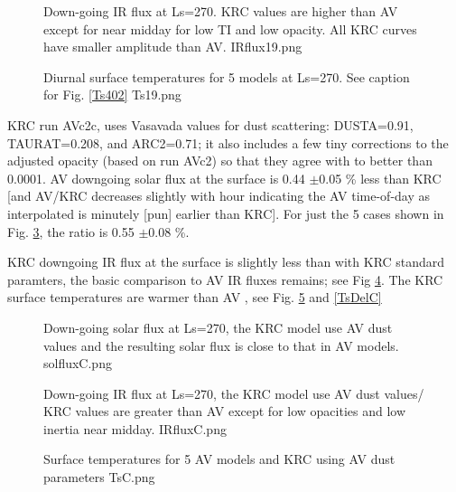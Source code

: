 \documentclass{article}
\begin{document}
\begin{figure}[!ht] 
\caption[IR flux 2]{Down-going IR flux at Ls=270\qd. KRC values are higher than AV except for near midday for low TI and low opacity. All KRC curves have smaller amplitude than AV.
\label{IRflux19} IRflux19.png }
\end{figure} 

\begin{figure}[!ht] 
\caption[Surface temperature 2]{Diurnal surface temperatures for 5 models at Ls=270\qd. See caption for Fig. \ref{Ts402}
\label{Ts19} Ts19.png }
\end{figure} 
\clearpage
{} %

KRC run AVc2c, uses Vasavada values for dust scattering: DUSTA=0.91,
TAURAT=0.208, and ARC2=0.71; it also includes a few tiny corrections to the
adjusted opacity (based on run AVc2) so that they agree with  to better
than 0.0001.  AV downgoing solar flux at the surface is 0.44 $\pm$0.05 \% less
than KRC [and AV/KRC decreases slightly with hour indicating the AV time-of-day
  as interpolated is minutely [pun] earlier than KRC]. For just the 5 cases
shown in Fig. \ref{solfluxC}, the ratio is 0.55 $\pm$0.08 \%.

KRC downgoing IR flux at the surface is slightly less than with KRC standard paramters, the basic comparison to AV IR fluxes remains; see Fig \ref{IRfluxC}. The KRC surface temperatures are warmer than AV , see Fig. \ref{TsC} and  \ref{TsDelC}

\begin{figure}[!ht] 
\caption[Solar flux with AV dust]{Down-going solar flux at Ls=270\qd, the KRC model use AV dust values and the resulting solar flux is close to that in AV models.
\label{solfluxC} solfluxC.png }
\end{figure} 

\begin{figure}[!ht] 
\caption[IR flux with AV dust]{Down-going IR flux at Ls=270\qd, the KRC model use AV dust values/ KRC values are greater than AV except for low opacities and low inertia near midday. 
\label{IRfluxC} IRfluxC.png }
\end{figure} 

\begin{figure}[!ht] 
\caption[Tsur with AV dust]{Surface temperatures for 5 AV models and KRC using AV dust parameters
\label{TsC} TsC.png }
\end{figure} 
\end{document}

